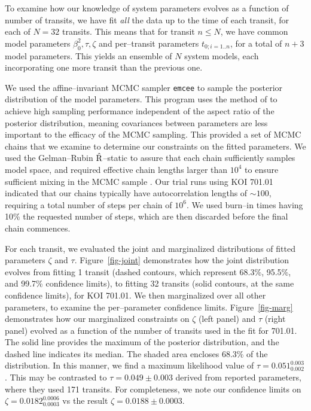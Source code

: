 To examine how our knowledge of system parameters evolves as a
function of number of transits, we have fit {\it all} the data up to
the time of each transit, for each of $N = 32$ transits.  This means
that for transit $n \leq N$, we have common model parameters
$\beta_{0}^2, \tau, \zeta$ and per--transit parameters $t_{0;i=1..n}$,
for a total of $n+3$ model parameters.  This yields an ensemble of $N$
system models, each incorporating one more transit than the previous
one.

We used the affine--invariant MCMC sampler {\tt emcee}
\citep{2013PASP..125..306F} to sample the posterior distribution of
the model parameters.  This program uses the method of
\cite{Goodman-Weare} to achieve high sampling performance independent
of the aspect ratio of the posterior distribution, meaning covariances
between parameters are less important to the efficacy of the MCMC
sampling.  This provided a set of MCMC chains that we examine to
determine our constraints on the fitted parameters.  We used the
Gelman--Rubin $\hat{\rm R}$--static \citep{Gelman92} to assure that
each chain sufficiently samples model space, and required effective
chain lengths larger than $10^4$ to ensure sufficient mixing in the
MCMC sample \cite[e.g.][]{2004PhRvD..69j3501T}.  Our trial runs using
KOI 701.01 indicated that our chains typically have autocorrelation
lengths of $\sim 100$, requiring a total number of steps per chain of
$10^6$.  We used burn--in times having 10\% the requested number of
steps, which are then discarded before the final chain commences.

For each transit, we evaluated the joint and marginalized
distributions of fitted parameters $\zeta$ and $\tau$.
Figure~\ref{fig-joint} demonstrates how the joint distribution evolves
from fitting 1 transit (dashed contours, which represent 68.3\%,
95.5\%, and 99.7\% confidence limits), to fitting 32 transits (solid
contours, at the same confidence limits), for KOI 701.01.  We then
marginalized over all other parameters, to examine the per--parameter
confidence limits.  Figure~\ref{fig-marg} demonstrates how our
marginalized constraints on $\zeta$ (left panel) and $\tau$ (right
panel) evolved as a function of the number of transits used in the fit
for 701.01.  The solid line provides the maximum of the posterior
distribution, and the dashed line indicates its median.  The shaded
area encloses 68.3\% of the distribution.  In this manner, we find a
maximum likelihood value of $\tau = 0.051_{0.002}^{0.003}$.  This may
be contrasted to $\tau = 0.049 \pm 0.003 $ derived from
reported \cite{2013arXiv1304.7387B} parameters, where they used 171
transits.  For completeness, we note our confidence limits on $\zeta =
0.0182_{0.0003}^{0.0006}$ vs the \cite{2013arXiv1304.7387B} result
$\zeta = 0.0188 \pm 0.0003$.

